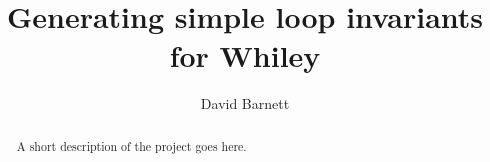 \documentclass[11pt
              , a4paper
              , openright
              ]{report}
\title{Generating simple loop invariants for Whiley}
\author{David Barnett}
\date{}
\begin{document}
\frontmatter



\begin{abstract}

A short description of the project goes here.

\end{abstract}


\maketitle



\tableofcontents



\mainmatter












\backmatter



%


\end{document}
